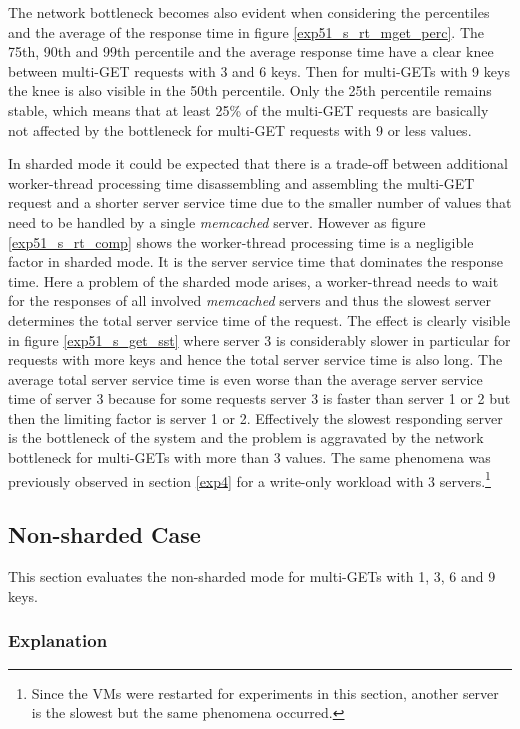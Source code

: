 \documentclass[report.tex]{subfiles}
\begin{document}
The network bottleneck becomes also evident when considering the percentiles and the average of the response time in figure \ref{exp51_s_rt_mget_perc}. The 75th, 90th and 99th percentile and the average response time have a clear knee between multi-GET requests with 3 and 6 keys. Then for multi-GETs with 9 keys the knee is also visible in the 50th percentile. Only the 25th percentile remains stable, which means that at least 25\% of the multi-GET requests are basically not affected by the bottleneck for multi-GET requests with 9 or less values.

In sharded mode it could be expected that there is a trade-off between additional worker-thread processing time disassembling and assembling the multi-GET request and a shorter server service time due to the smaller number of values that need to be handled by a single \emph{memcached} server. However as figure \ref{exp51_s_rt_comp} shows the worker-thread processing time is a negligible factor in sharded mode. It is the server service time that dominates the response time. Here a problem of the sharded mode arises, a worker-thread needs to wait for the responses of all involved \emph{memcached} servers and thus the slowest server determines the total server service time of the request.  The effect is clearly visible in figure \ref{exp51_s_get_sst} where server 3 is considerably slower in particular for requests with more keys and hence the total server service time is also long. The average total server service time is even worse than the average server service time of server 3 because for some requests server 3 is faster than server 1 or 2 but then the limiting factor is server 1 or 2. Effectively the slowest responding server is the bottleneck of the system and the problem is aggravated by the network bottleneck for multi-GETs with more than 3 values.
The same phenomena was previously observed in section \ref{exp4} for a write-only workload with 3 servers.\footnote{Since the VMs were restarted for experiments in this section, another server is the slowest but the same phenomena occurred.}


\subsection{Non-sharded Case}

This section evaluates the non-sharded mode for multi-GETs with 1, 3, 6 and 9 keys.

\subsubsection{Explanation}
\end{document}
